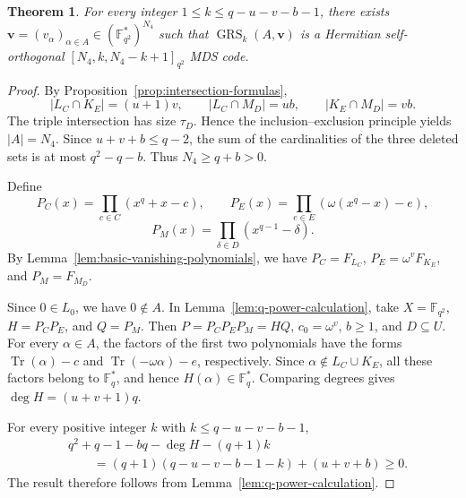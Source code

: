 \documentclass[10pt,a4paper]{amsart}
\newtheorem{theorem}{Theorem}
\newcommand{\GRS}{\operatorname{GRS}}
\newcommand{\Tr}{\operatorname{Tr}}
\begin{document}
\begin{theorem}\label{thm:fourth-grs}
For every integer $1\le k\le q-u-v-b-1$, there exists $\boldsymbol v=(v_\alpha)_{\alpha\in A}\in (\mathbb F_{q^2}^{*})^{N_4}$ such that $\GRS_k(A,\boldsymbol v)$ is a Hermitian self-orthogonal $[N_4,k,N_4-k+1]_{q^2}$ MDS code.
\end{theorem}

\begin{proof}
By Proposition~\ref{prop:intersection-formulas},
\[
 |L_C\cap K_E|=(u+1)v,
 \qquad
 |L_C\cap M_D|=ub,
 \qquad
 |K_E\cap M_D|=vb.
\]
The triple intersection has size $\tau_D$. Hence the inclusion--exclusion principle yields $|A|=N_4$. Since $u+v+b\le q-2$, the sum of the cardinalities of the three deleted sets is at most $q^2-q-b$. Thus $N_4\ge q+b>0$.

Define
\[
 P_C(x)=\prod_{c\in C}(x^q+x-c),
 \qquad
 P_E(x)=\prod_{e\in E}(\omega(x^q-x)-e),
\]
\[
 P_M(x)=\prod_{\delta\in D}(x^{q-1}-\delta).
\]
By Lemma~\ref{lem:basic-vanishing-polynomials}, we have $P_C=F_{L_C}$, $P_E=\omega^vF_{K_E}$, and $P_M=F_{M_D}$.

Since $0\in L_0$, we have $0\notin A$. In Lemma~\ref{lem:q-power-calculation}, take $X=\mathbb F_{q^2}$, $H=P_CP_E$, and $Q=P_M$. Then $P=P_CP_EP_M=HQ$, $c_0=\omega^v$, $b\ge1$, and $D\subseteq U$. For every $\alpha\in A$, the factors of the first two polynomials have the forms $\Tr(\alpha)-c$ and $\Tr(-\omega\alpha)-e$, respectively. Since $\alpha\notin L_C\cup K_E$, all these factors belong to $\mathbb F_q^{*}$, and hence $H(\alpha)\in\mathbb F_q^{*}$. Comparing degrees gives $\deg H=(u+v+1)q$.

For every positive integer $k$ with $k\le q-u-v-b-1$,
\[
\begin{aligned}
 &q^2+q-1-bq-\deg H-(q+1)k\\
 &\qquad=(q+1)(q-u-v-b-1-k)+(u+v+b)\ge0.
\end{aligned}
\]
The result therefore follows from Lemma~\ref{lem:q-power-calculation}.
\end{proof}
\end{document}

